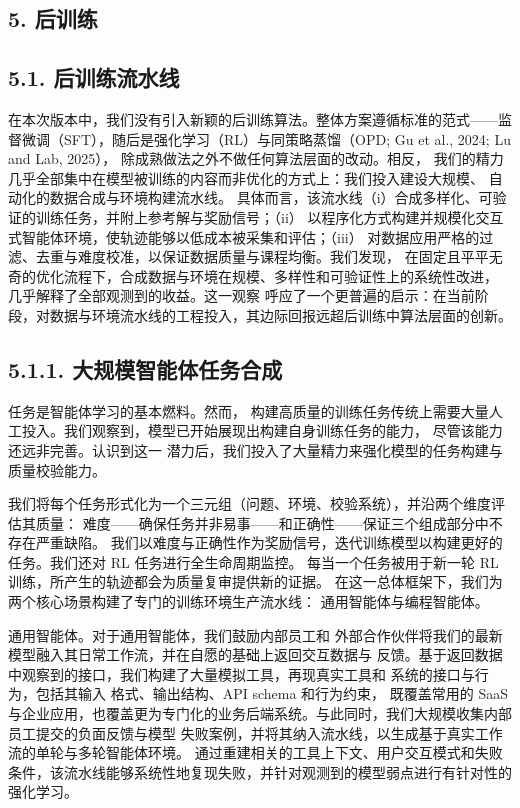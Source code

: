 \subsection{5. 后训练}\label{post-training}

\subsection{5.1. 后训练流水线}\label{post-training-pipeline}

在本次版本中，我们没有引入新颖的后训练算法。整体方案遵循标准的范式——监督微调（SFT），随后是强化学习（RL）与同策略蒸馏（OPD; Gu et al., 2024; Lu and Lab, 2025），
除成熟做法之外不做任何算法层面的改动。相反，
我们的精力几乎全部集中在模型被训练的内容而非优化的方式上：我们投入建设大规模、
自动化的数据合成与环境构建流水线。
具体而言，该流水线（i）合成多样化、可验证的训练任务，并附上参考解与奖励信号；（ii）
以程序化方式构建并规模化交互式智能体环境，使轨迹能够以低成本被采集和评估；（iii）
对数据应用严格的过滤、去重与难度校准，以保证数据质量与课程均衡。我们发现，
在固定且平平无奇的优化流程下，合成数据与环境在规模、多样性和可验证性上的系统性改进，
几乎解释了全部观测到的收益。这一观察
呼应了一个更普遍的启示：在当前阶段，对数据与环境流水线的工程投入，其边际回报远超后训练中算法层面的创新。

\subsection{5.1.1. 大规模智能体任务合成}\label{large-scale-agent-task-synthesis}

任务是智能体学习的基本燃料。然而，
构建高质量的训练任务传统上需要大量人工投入。我们观察到，模型已开始展现出构建自身训练任务的能力，
尽管该能力还远非完善。认识到这一
潜力后，我们投入了大量精力来强化模型的任务构建与质量校验能力。

我们将每个任务形式化为一个三元组（问题、环境、校验系统），并沿两个维度评估其质量：
难度——确保任务并非易事——和正确性——保证三个组成部分中不存在严重缺陷。
我们以难度与正确性作为奖励信号，迭代训练模型以构建更好的任务。我们还对 RL 任务进行全生命周期监控。
每当一个任务被用于新一轮 RL 训练，所产生的轨迹都会为质量复审提供新的证据。
在这一总体框架下，我们为两个核心场景构建了专门的训练环境生产流水线：
通用智能体与编程智能体。



通用智能体。对于通用智能体，我们鼓励内部员工和
外部合作伙伴将我们的最新模型融入其日常工作流，并在自愿的基础上返回交互数据与
反馈。基于返回数据中观察到的接口，我们构建了大量模拟工具，再现真实工具和
系统的接口与行为，包括其输入
格式、输出结构、API schema 和行为约束，
既覆盖常用的 SaaS 与企业应用，也覆盖更为专门化的业务后端系统。与此同时，我们大规模收集内部员工提交的负面反馈与模型
失败案例，并将其纳入流水线，以生成基于真实工作流的单轮与多轮智能体环境。
通过重建相关的工具上下文、用户交互模式和失败条件，该流水线能够系统性地复现失败，并针对观测到的模型弱点进行有针对性的强化学习。

